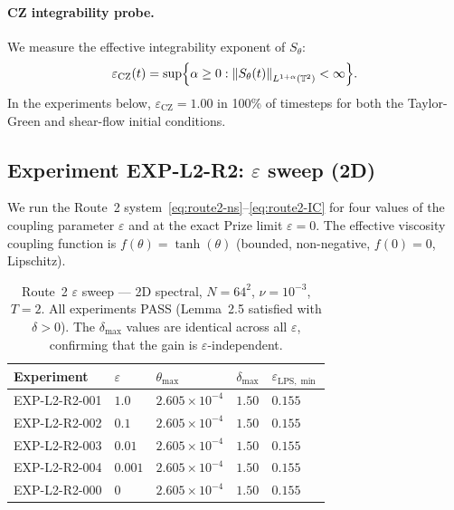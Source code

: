 \documentclass[11pt]{article}
\theoremstyle{definition}
\newcommand{\T}{\mathbb{T}}
\newcommand{\norm}[1]{\left\|#1\right\|}
\newcommand{\eps}{\varepsilon}
\newcommand{\LPS}{\mathrm{LPS}}
\newcommand{\CZ}{\mathrm{CZ}}
\newcommand{\thetafield}{\theta}
\begin{document}
\paragraph{CZ integrability probe.}
We measure the effective integrability exponent of $S_\theta$:
\begin{equation}
  \eps_{\CZ}(t) = \sup \Bigl\{ \alpha \geq 0 :
    \norm{S_\theta(t)}_{L^{1+\alpha}(\T^2)} < \infty \Bigr\}.
\end{equation}
In the experiments below, $\eps_{\CZ} = 1.00$ in 100\% of timesteps for both the
Taylor-Green and shear-flow initial conditions.

\subsection{Experiment EXP-L2-R2: $\eps$ sweep (2D)}

We run the Route~2 system~\eqref{eq:route2-ns}--\eqref{eq:route2-IC}
for four values of the coupling parameter $\eps$ and at the exact Prize limit $\eps = 0$.
The effective viscosity coupling function is $f(\thetafield) = \tanh(\thetafield)$
(bounded, non-negative, $f(0) = 0$, Lipschitz).

\begin{table}[h]
\centering
\caption{Route~2 $\eps$ sweep — 2D spectral, $N=64^2$, $\nu=10^{-3}$, $T=2$.
All experiments PASS (Lemma~2.5 satisfied with $\delta > 0$).
The $\delta_{\max}$ values are identical across all $\eps$,
confirming that the gain is $\eps$-independent.}
\label{tab:eps-sweep}
\smallskip
\begin{tabular}{@{}lllll@{}}
\toprule
Experiment & $\eps$ & $\theta_{\max}$ & $\delta_{\max}$ & $\eps_{\LPS,\min}$ \\
\midrule
EXP-L2-R2-001 & $1.0$   & $2.605 \times 10^{-4}$ & $1.50$ & $0.155$ \\
EXP-L2-R2-002 & $0.1$   & $2.605 \times 10^{-4}$ & $1.50$ & $0.155$ \\
EXP-L2-R2-003 & $0.01$  & $2.605 \times 10^{-4}$ & $1.50$ & $0.155$ \\
EXP-L2-R2-004 & $0.001$ & $2.605 \times 10^{-4}$ & $1.50$ & $0.155$ \\
EXP-L2-R2-000 & $0$     & $2.605 \times 10^{-4}$ & $1.50$ & $0.155$ \\
\bottomrule
\end{tabular}
\end{table}
\end{document}

